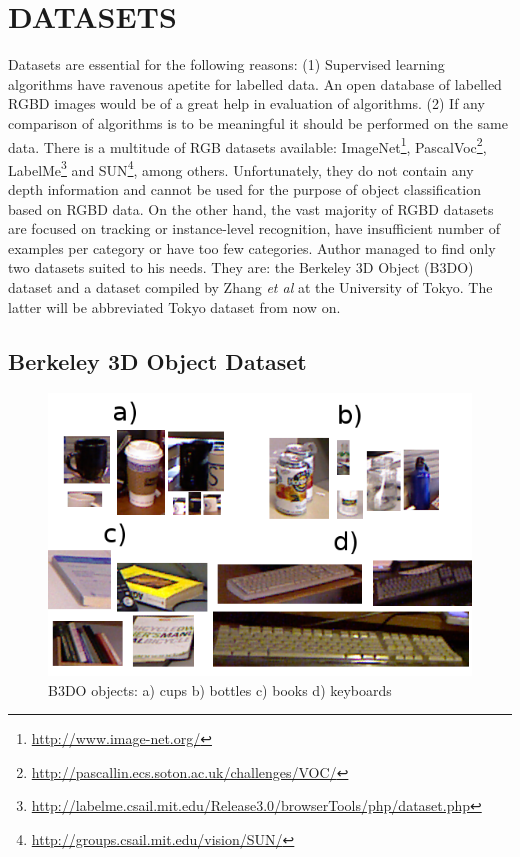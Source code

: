 \documentclass[11pt,twoside]{article}
\begin{document}
\section{ DATASETS }

  Datasets are essential for the following reasons: (1) Supervised learning algorithms have ravenous apetite for labelled data. An open database of labelled RGBD images would be of a great help in evaluation of algorithms. (2) If any comparison of algorithms is to be meaningful it should be performed on the same data. There is a multitude of RGB datasets available: ImageNet\footnote{\url{http://www.image-net.org/}}, PascalVoc\footnote{\url{http://pascallin.ecs.soton.ac.uk/challenges/VOC/}}, LabelMe\footnote{\url{http://labelme.csail.mit.edu/Release3.0/browserTools/php/dataset.php}} and SUN\footnote{\url{http://groups.csail.mit.edu/vision/SUN/}}, among others. Unfortunately, they do not contain any depth information and cannot be used for the purpose of object classification based on RGBD data. On the other hand, the vast majority of RGBD datasets are focused on tracking or instance-level recognition, have insufficient number of examples per category or have too few categories. Author managed to find only two datasets suited to his needs. They are: the Berkeley 3D Object (B3DO) dataset \cite{B3DO} and a dataset compiled by Zhang \emph{et al} at the University of Tokyo\cite{zhangcategory}. The latter will be abbreviated Tokyo dataset from now on.

  \subsection{Berkeley 3D Object Dataset}
    \begin{figure}[!ht]
    \centering	
    \includegraphics[width=.75\textwidth]{../figs/b3do_objects}
    \caption{B3DO objects: a) cups b) bottles c) books d) keyboards}
    \label{fig:b3do_objects}
    \end{figure}    
    
\end{document}
